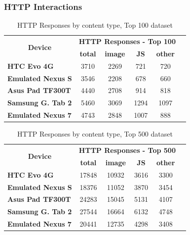\documentclass{acm_proc_article-sp}
\begin{document}
\subsubsection{HTTP Interactions}

\begin{table}[htbp]
  \centering
  \caption{HTTP Responses by content type, Top 100 dataset}
    \begin{tabular}{|c|c|c|c|c|c|}
    \hline
    \multicolumn{1}{|c|}{\multirow{2}[4]{*}{\textbf{Device}}} & \multicolumn{4}{|c|}{\textbf{HTTP Responses - Top 100}} \\ \cline{2-5}
    \multicolumn{1}{|c|}{} & \textbf{total} & \textbf{image} & \textbf{JS} & \textbf{other} \\ \hline
    \multicolumn{1}{|l|}{\textbf{HTC Evo 4G}} & 3710  & 2269  & 721   & 720 \\
    \multicolumn{1}{|l|}{\textbf{Emulated Nexus S}} & 3546  & 2208  & 678   & 660 \\
    \multicolumn{1}{|l|}{\textbf{Asus Pad TF300T}} & 4440  & 2708  & 914   & 818 \\
    \multicolumn{1}{|l|}{\textbf{Samsung G. Tab 2}} & 5460  & 3069  & 1294  & 1097 \\
    \multicolumn{1}{|l|}{\textbf{Emulated Nexus 7}} & 4743  & 2848  & 1007  & 888 \\ \hline
    \end{tabular}%
  \label{tab:addlabel}%
\end{table}%

\begin{table}[htbp]
  \centering
  \caption{HTTP Responses by content type, Top 500 dataset}
    \begin{tabular}{|c|c|c|c|c|c|}
    \hline
    \multicolumn{1}{|c|}{\multirow{2}[4]{*}{\textbf{Device}}} & \multicolumn{4}{|c|}{\textbf{HTTP Responses - Top 500}} \\ \cline{2-5}
    \multicolumn{1}{|c|}{} & \textbf{total} & \textbf{image} & \textbf{JS} & \textbf{other} \\ \hline
    \multicolumn{1}{|l|}{\textbf{HTC Evo 4G}} & 17848 & 10932 & 3616  & 3300 \\
    \multicolumn{1}{|l|}{\textbf{Emulated Nexus S}} & 18376 & 11052 & 3870  & 3454 \\
    \multicolumn{1}{|l|}{\textbf{Asus Pad TF300T}} & 24283 & 15045 & 5131  & 4107 \\
    \multicolumn{1}{|l|}{\textbf{Samsung G. Tab 2}} & 27544 & 16664 & 6132  & 4748 \\
    \multicolumn{1}{|l|}{\textbf{Emulated Nexus 7}} & 20441 & 12735 & 4298  & 3408 \\
 \hline
    \end{tabular}%
  \label{tab:addlabel}%
\end{table}%
\end{document}

